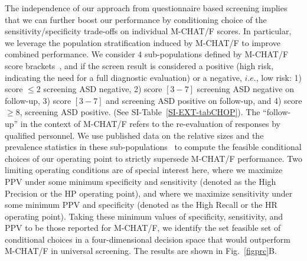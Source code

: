 \documentclass[3p,super,numbers,sort&compress,10pt]{elsarticle}
\begin{document}
The independence of our approach from questionnaire based screening implies that we can further boost our performance by conditioning choice of the sensitivity/specificity trade-offs on individual M-CHAT/F scores. In particular, we leverage the population stratification induced by M-CHAT/F to improve combined performance. %
We consider  $4$ sub-populations defined by M-CHAT/F score brackets~\cite{pmid31562252}, and if the screen result is considered a positive (high risk, indicating the need for a full diagnostic evaluation) or a negative, $i.e. $, low risk: 1) score   $\leq 2$  screening ASD negative, 2) score $[3-7]$ screening ASD negative on follow-up, 3) score  $[3-7]$ and  screening ASD positive on follow-up, and 4) score  $\geq 8$,  screening ASD positive. (See SI-Table~\ref{SI-EXT-tabCHOP}). The ``follow-up'' in the context of M-CHAT/F refers to the re-evaluation of responses by qualified personnel. We use published data on the relative sizes and the prevalence statistics in these sub-populations~\cite{pmid31562252} to   compute the feasible conditional choices of our  operating point  to strictly supersede  M-CHAT/F performance. Two limiting operating conditions are  of special interest here, where we maximize PPV under some minimum specificity and sensitivity (denoted as  the High Precision or the HP operating point), and where we maximize sensitivity under some minimum PPV and specificity (denoted as the High Recall or the HR  operating point). Taking these minimum values of specificity, sensitivity, and PPV to be those reported for  M-CHAT/F, we identify the set feasible set of conditional choices in a four-dimensional decision space  that would  outperform M-CHAT/F in universal screening. The results are shown in Fig.~\ref{figprc}B.
\end{document}
